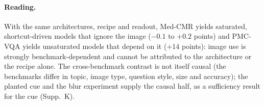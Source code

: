 \paragraph{Reading.}
With the same architectures, recipe and readout, Med-CMR yields saturated, shortcut-driven models that ignore the image ($-0.1$ to $+0.2$ points) and PMC-VQA yields unsaturated models that depend on it ($+14$ points): image use is strongly benchmark-dependent and cannot be attributed to the architecture or the recipe alone.
The cross-benchmark contrast is not itself causal (the benchmarks differ in topic, image type, question style, size and accuracy); the planted cue and the blur experiment supply the causal half, as a sufficiency result for the cue (Supp.~K).
